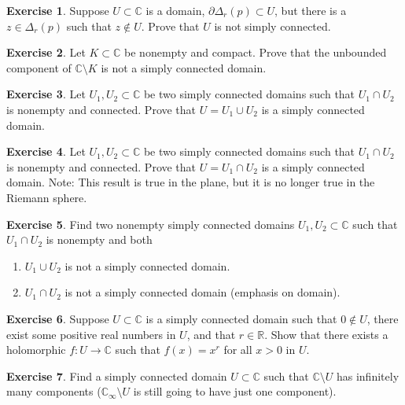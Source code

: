 \documentclass[12pt,openany]{book}
\newcommand{\C}{{\mathbb{C}}}
\newcommand{\R}{{\mathbb{R}}}
\theoremstyle{plain}
\theoremstyle{remark}
\theoremstyle{definition}
\newenvironment{exbox}{%
    \def\FrameCommand{\vrule width 1pt \relax\hspace{10pt}}%
    \MakeFramed{\advance\hsize-\width\FrameRestore}%
}{%
    \endMakeFramed
}
\newenvironment{exnumparts}{%
    \leavevmode\begin{enumerate}[1),noitemsep,topsep=0pt,parsep=0pt,partopsep=0pt]
}{%
    \end{enumerate}
}
\theoremstyle{exercise}
\newtheorem{exercise}{Exercise}[section]
\theoremstyle{example}
\begin{document}
\begin{exbox}
\begin{exercise}
Suppose $U \subset \C$ is a domain, $\partial \Delta_r(p) \subset U$,
but there is a $z \in \Delta_r(p)$ such that $z \notin U$.
Prove that $U$ is not simply connected.
\end{exercise}

\begin{exercise}
Let $K \subset \C$ be nonempty and compact.
Prove that the unbounded component of $\C \setminus K$ is not a
simply connected domain.
\end{exercise}

\begin{exercise}
Let $U_1,U_2 \subset \C$ be two simply connected domains such that $U_1 \cap
U_2$ is nonempty and connected.
Prove that $U = U_1 \cup U_2$ is a simply connected domain.
\end{exercise}

\begin{exercise}
Let $U_1,U_2 \subset \C$ be two simply connected domains such that $U_1 \cap
U_2$ is nonempty and connected.
Prove that $U = U_1 \cap U_2$ is a simply connected domain.
Note: This result is true in the plane, but it is no longer true in the Riemann
sphere.
\end{exercise}

\begin{exercise}
Find two nonempty simply connected domains
$U_1,U_2 \subset \C$ such that $U_1 \cap U_2$ is nonempty and both
\begin{exnumparts}
\item
$U_1 \cup U_2$ is not a simply connected domain.
\item
$U_1 \cap U_2$ is not a simply connected domain (emphasis on domain).
\end{exnumparts}
\end{exercise}

\begin{exercise}
Suppose $U \subset \C$ is a simply connected domain such that $0 \notin U$,
there exist some positive real numbers in $U$, and that $r \in \R$.
Show that there exists a holomorphic $f \colon U \to \C$ such
that $f(x) = x^r$ for all $x > 0$ in $U$.
\end{exercise}

\begin{exercise}
Find a simply connected domain $U \subset \C$ such that $\C \setminus U$
has infinitely many components ($\C_\infty \setminus U$ is still going to
have just one component).
\end{exercise}
\end{exbox}
\end{document}
